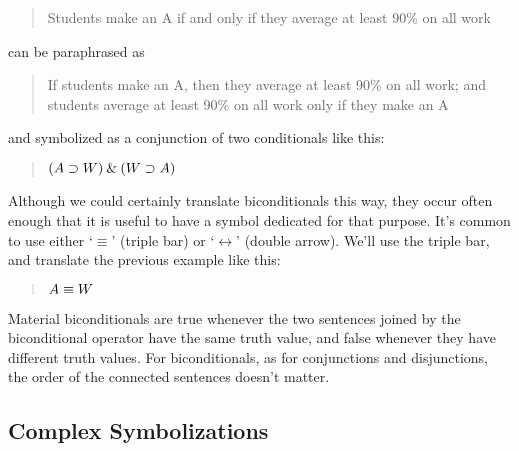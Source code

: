 \documentclass[../logic-text.tex]{subfiles}
\begin{document}
\begin{quote}
  Students make an A if and only if they average at least 90\% on all work
\end{quote}

\noindent can be paraphrased as

\begin{quote}
If students make an A, then they average at least 90\% on all work; and students average at least 90\% on all work only if they make an A
\end{quote}

\noindent and symbolized as a conjunction of two conditionals like this:

\begin{quote}
  \((A \supset W) \mathbin{\&} (W \supset A)\)
\end{quote}

Although we could certainly translate biconditionals this way, they occur often enough that it is useful to have a symbol dedicated for that purpose. It's common to use either  \enquote*{\(\equiv\)} (triple bar) or \enquote*{\(\leftrightarrow\)} (double arrow). We'll use the triple bar, and translate the previous example like this:

\begin{quote}
  \(A \equiv W\)
\end{quote}

Material biconditionals are true whenever the two sentences joined by the biconditional operator have the same truth value, and false whenever they have different truth values. For biconditionals, as for conjunctions and disjunctions, the order of the connected sentences doesn't matter.

\subsection{Complex Symbolizations}
\label{sec:compl-symb}
\end{document}
